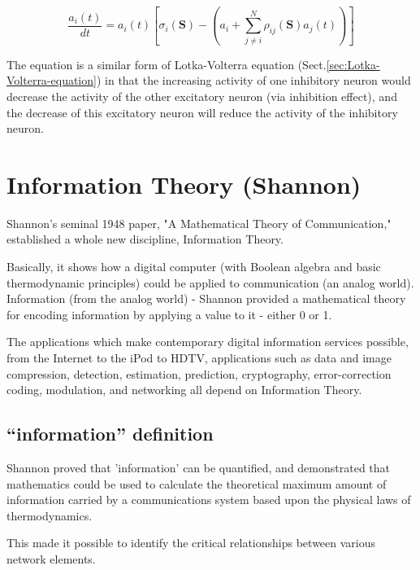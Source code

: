 \begin{equation}
\frac{a_i(t)}{dt} = a_i(t) \left[  \sigma_i(\mathbf{S}) - \left( a_i +
\sum_{j\neq i}^{N} \rho_{ij}(\mathbf{S}) a_j(t) \right) \right]
\end{equation}

The equation is a similar form of Lotka-Volterra equation
(Sect.\ref{sec:Lotka-Volterra-equation}) in that the increasing activity of one
inhibitory neuron would decrease the activity of the other excitatory neuron
(via inhibition effect), and the decrease of this excitatory neuron will reduce
the activity of the inhibitory neuron.

\subsection{}



\section{Information Theory (Shannon)}

Shannon's seminal 1948 paper, "A Mathematical Theory of Communication,"
established a whole new discipline, Information Theory.

Basically, it shows how a digital computer (with  Boolean algebra and basic
thermodynamic principles) could be applied to communication (an analog world).
Information (from the analog world) - Shannon provided a mathematical theory for
encoding information by applying a value to it - either 0 or 1.

The applications which make contemporary digital information services possible,
from the Internet to the iPod to HDTV, applications such as data and image
compression, detection, estimation, prediction, cryptography, error-correction
coding, modulation, and networking all depend on Information Theory.

\subsection{``information'' definition}

Shannon proved that 'information' can be quantified, and demonstrated that
mathematics could be used to calculate the theoretical maximum amount of
information carried by a communications system based upon the physical laws of
thermodynamics.

This made it possible to identify the critical relationships between various
network elements.


